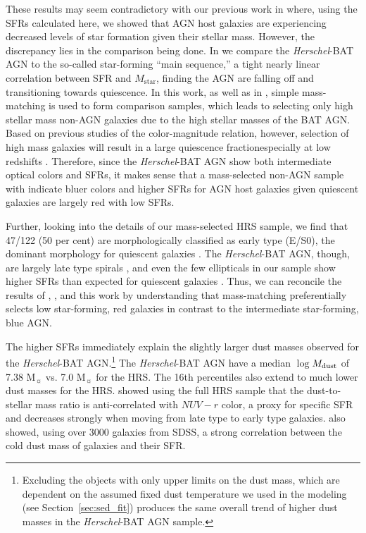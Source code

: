 \documentclass[fleqn, usenatbib]{mnras}
\newcommand{\herschel}{\emph{Herschel}}
\newcommand{\msun}{M$_{\sun}$}
\newcommand{\mstar}{$M_{\mathrm{star}}$}
\newcommand{\mdust}{$M_{\rm dust}$}
\begin{document}
These results may seem contradictory with our previous work in \citet{Shimizu:2015xo} where, using the SFRs calculated here, we showed that AGN host galaxies are experiencing decreased levels of star formation given their stellar mass. However, the discrepancy lies in the comparison being done. In \citet{Shimizu:2015xo} we compare the \herschel-BAT AGN to the so-called star-forming ``main sequence,'' a tight nearly linear correlation between SFR and \mstar \citep{Brinchmann:2004bf, Salim:2007rm, Noeske:2007fr}, finding the AGN are falling off and transitioning towards quiescence. In this work, as well as in \citet{Koss:2011vn}, simple mass-matching is used to form comparison samples, which leads to selecting only high stellar mass non-AGN galaxies due to the high stellar masses of the BAT AGN. Based on previous studies of the color-magnitude relation, however, selection of high mass galaxies will result in a large quiescence fractionespecially at low redshifts  \citep{Kauffmann:2003lr, Wuyts:2011lh, Bell:2012qf}. Therefore, since the \herschel-BAT AGN show both intermediate optical colors and SFRs, it makes sense that a mass-selected non-AGN sample with indicate bluer colors and higher SFRs for AGN host galaxies given quiescent galaxies are largely red with low SFRs.

Further, looking into the details of our mass-selected HRS sample, we find that 47/122 (50 per cent) are morphologically classified as early type (E/S0), the dominant morphology for quiescent galaxies \citep{Wuyts:2011lh, Bell:2012qf}. The \herschel-BAT AGN, though, are largely late type spirals \citep{Koss:2011vn}, and even the few ellipticals in our sample show higher SFRs than expected for quiescent galaxies \citep{Shimizu:2015xo}. Thus, we can reconcile the results of \citet{Koss:2011vn}, \citet{Shimizu:2015xo}, and this work by understanding that mass-matching preferentially selects low star-forming, red galaxies in contrast to the intermediate star-forming, blue AGN.

The higher SFRs immediately explain the slightly larger dust masses observed for the \herschel-BAT AGN.\footnote{Excluding the objects with only upper limits on the dust mass, which are dependent on the assumed fixed dust temperature we used in the modeling (see Section~\ref{sec:sed_fit}) produces the same overall trend of higher dust masses in the \herschel-BAT AGN sample.} The \herschel-BAT AGN  have a median $\log$\mdust{} of 7.38 \msun{} vs. 7.0 \msun{} for the HRS. The 16th percentiles also extend to much lower dust masses for the HRS. \citet{Cortese:2012xy} showed using the full HRS sample that the dust-to-stellar mass ratio is anti-correlated with $NUV-r$ color, a proxy for specific SFR and decreases strongly when moving from late type to early type galaxies. \citet{da-Cunha:2010qf} also showed, using over 3000 galaxies from SDSS, a strong correlation between the cold dust mass of galaxies and their SFR. 
\end{document}
